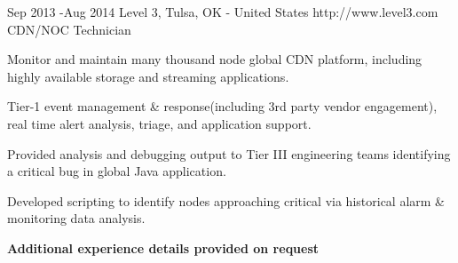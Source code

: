 \documentclass[10pt]{article} %
\begin{document}

\job
{Sep 2013 -}{Aug 2014}
{Level 3, Tulsa, OK - United States}
{http://www.level3.com}
{CDN/NOC Technician}
{
\begin{itemize-noindent}
\item{Monitor and maintain many thousand node global CDN platform, including highly available storage and streaming applications.}
\item{Tier-1 event management \& response(including 3rd party vendor engagement), real time alert analysis, triage, and application support.}
\item{Provided analysis and debugging output to Tier III engineering teams identifying a critical bug in global Java application.}
\item{Developed scripting to identify nodes approaching critical via historical alarm \& monitoring data analysis.}
\end{itemize-noindent}
}

\textbf{Additional experience details provided on request}
\end{document}
